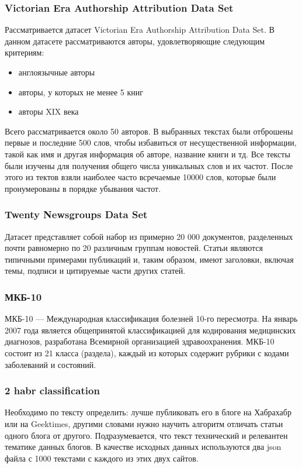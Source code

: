 \documentclass{article}
\begin{document}
\subsubsection{Victorian Era Authorship Attribution Data Set}
Рассматривается датасет Victorian Era Authorship Attribution Data Set. В данном датасете рассматриваются авторы, удовлетворяющие следующим критериям: 
\begin{itemize}
\item англоязычные авторы
\item авторы, у которых не менее 5 книг 
\item авторы XIX века
\end{itemize}
Всего рассматривается около 50 авторов. В выбранных текстах были отброшены первые и последние 500 слов, чтобы избавиться от несущественной информации, такой как имя и другая информация об авторе, название книги и тд. Все тексты были изучены для получения общего числа уникальных слов и их частот. После этого из тектов взяли наиболее часто всречаемые 10000 слов, которые были пронумерованы в порядке убывания частот. 
\subsubsection{Twenty Newsgroups Data Set}
Датасет представляет собой набор из примерно 20 000 документов, разделенных почти равномерно по 20 различным группам новостей. Статьи являются типичными примерами публикаций и, таким образом, имеют заголовки, включая темы, подписи и цитируемые части других статей.
\subsubsection{МКБ-10}
МКБ-10 — Международная классификация болезней 10-го пересмотра. На январь 2007 года является общепринятой классификацией для кодирования медицинских диагнозов, разработана Всемирной организацией здравоохранения. МКБ-10 состоит из 21 класса (раздела), каждый из которых содержит рубрики с кодами заболеваний и состояний.
\subsubsection{2 habr classification}
Необходимо по тексту определить: лучше публиковать его в блоге на Хабрахабр или на Geektimes, другими словами нужно научить алгоритм отличать статьи одного блога от другого. Подразумевается, что текст технический и релевантен тематике данных блогов.
В качестве исходных данных используются два json файла с 1000 текстами с каждого из этих двух сайтов.
\end{document}

